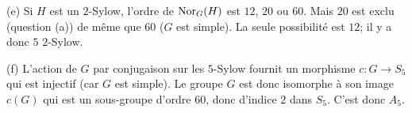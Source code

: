 {{(e) Si $H$ est un $2$-Sylow, l'ordre de $\hbox{\rm Nor}_G(H)$ est $12$, $20$ ou
$60$. Mais $20$ est exclu (question (a)) de m\^eme que $60$ ($G$ est simple). La
seule possibilit\'e est $12$; il y a donc $5$ $2$-Sylow.
\smallskip

(f) L'action de $G$ par conjugaison sur les $5$-Sylow fournit un morphisme
$c:G\rightarrow S_5$ qui est injectif (car $G$ est simple). Le groupe $G$ est donc
isomorphe \`a son image $c(G)$ qui est un sous-groupe d'ordre $60$, donc d'indice
$2$ dans $S_5$. C'est donc $A_5$.}
}
